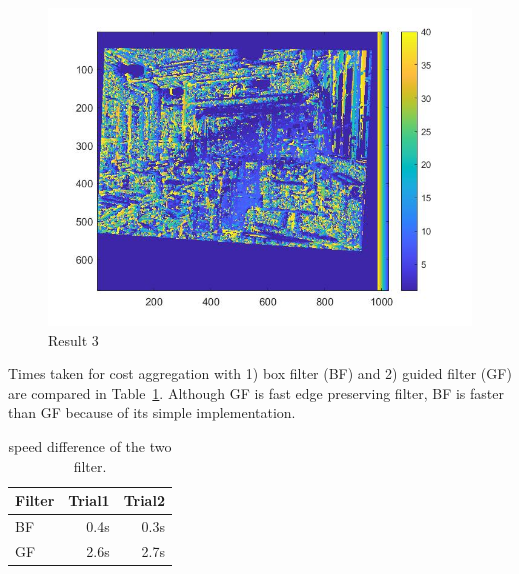 \begin{figure}[h]
    \centering
    \includegraphics[width=13cm]{writeup/guided filter with no guidance.jpg}
    \caption{Result 3}
    \label{fig:result3}
\end{figure}

Times taken for cost aggregation with 1) box filter (BF) and 2) guided filter (GF) are compared in Table~\ref{tab:table1}. Although GF is fast edge preserving filter, BF is faster than GF because of its simple implementation.


\begin{table}[h]
    \centering
    \begin{tabular}{lrr}
        \toprule
        Filter & Trial1 & Trial2 \\
        \midrule
        BF & 0.4s & 0.3s\\
        GF & 2.6s & 2.7s\\
        \bottomrule
    \end{tabular}
    \caption{speed difference of the two filter.}
    \label{tab:table1}
\end{table}




